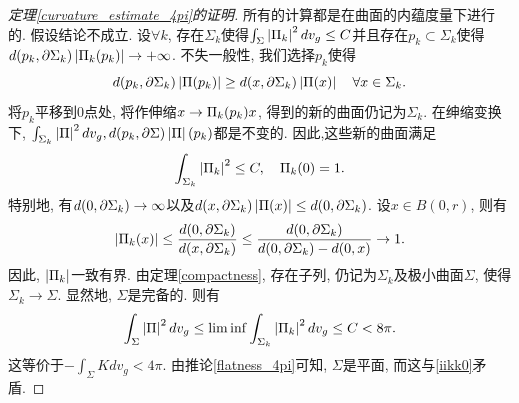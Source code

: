 \begin{proof}[定理\eqref{curvature_estimate_4pi}的证明]
    所有的计算都是在曲面的内蕴度量下进行的. 假设结论不成立. 设$\forall k$, 存在$\Sigma_k$使得$\int_\Sigma \abs{\II_k}^2dv_g \le C$并且存在$p_k \subset \Sigma_k$使得$d(p_k,\P \Sigma_k)\abs{\II_k(p_k)} \to +\infty$. 不失一般性, 我们选择$p_k$使得
    \begin{equation}
        d(p_k, \P \Sigma_k)\abs{\II(p_k)} \ge d(x,\P \Sigma_k)\abs{\II(x)} \s \forall x \in \Sigma_k.
    \end{equation}
    将$p_k$平移到0点处, 将作伸缩$x \to \II_k(p_k)x$, 得到的新的曲面仍记为$\Sigma_k$. 在绅缩变换下,  $\int_{\Sigma_k}\abs{\II}^2dv_g, d(p_k,\P \Sigma)\abs{\II}(p_k)$都是不变的.  因此,这些新的曲面满足
    \begin{equation} \label{iikk0}
        \int_{\Sigma_k} \abs{\II_k}^2 \le C, \s \II_k(0) =1.
    \end{equation}
    特别地, 有$d(0,\P \Sigma_k) \to \infty$以及$d(x,\P \Sigma_k) \abs{\II(x)} \le d(0,\P \Sigma_k)$. 设$x \in B(0,r)$, 则有
    \begin{equation}
        \abs{\II_k(x)} \le \frac{d(0,\P \Sigma_k)}{d(x,\P \Sigma_k)} \le \frac{d(0,\P \Sigma_k)}{d(0,\P \Sigma_k) - d(0,x)} \to 1.
    \end{equation}
    因此, $\abs{\II_k}$一致有界. 由定理\eqref{compactness}, 存在子列, 仍记为$\Sigma_k$及极小曲面$\Sigma$, 使得$\Sigma_k \to \Sigma$. 显然地, $\Sigma$是完备的. 则有
    \begin{equation}
        \int_\Sigma \abs{\II}^2dv_g \le \liminf \int_{\Sigma_k} \abs{\II_k}^2dv_g \le C < 8\pi.
    \end{equation}
    这等价于$-\int_\Sigma K dv_g < 4\pi$. 由推论\eqref{flatness_4pi}可知, $\Sigma$是平面, 而这与\eqref{iikk0}矛盾.
\end{proof}